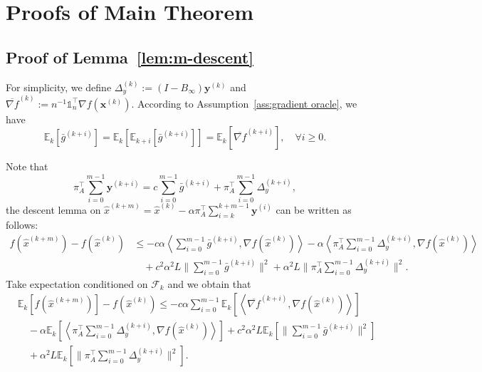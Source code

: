 \documentclass[10pt]{article}
\newcommand{\one}{\mathds{1}_n}
\newcommand{\vx}{{\mathbf{x}}}
\newcommand{\vy}{{\mathbf{y}}}
\newcommand{\cF}{{\mathcal{F}}}
\newcommand{\EE}{\mathbb{E}}
\newcommand{\norm}[1]{\| #1 \|}
\newcommand{\ip}[1]{\left\langle#1\right\rangle}
\begin{document}
\section{Proofs of Main Theorem}\label{app:sec:proofs}

\subsection{Proof of Lemma~\ref{lem:m-descent}}\label{app:subsec:lem 4.3}
For simplicity, we define $\Delta_y^{(k)}:=(I-B_\infty)\vy^{(k)}$ and $\overline{\nabla f}^{(k)}:=n^{-1}\one^\top \nabla f (\vx^{(k)})$. According to Assumption~\ref{ass:gradient oracle}, we have
\[\EE_k[\bar{g}^{(k+i)}]=\EE_k[\EE_{k+i}[\bar{g}^{(k+i)}]]=\EE_k[\overline{\nabla f}^{(k+i)}],\quad \forall i\ge 0.\]

Note that 
\[\pi_A^\top\sum_{i=0}^{m-1} \vy^{(k+i)} = c\sum_{i=0}^{m-1}\bar{g}^{(k+i)}+\pi_A^\top \sum_{i=0}^{m-1}\Delta_y^{(k+i)},\]
the descent lemma on $\hat{x}^{(k+m)}=\hat{x}^{(k)}-\alpha \pi_A^\top\sum_{i=k}^{k+m-1}\vy^{(i)}$ can be written as follows:
\begin{align*}
    f(\hat{x}^{(k+m)})- f(\hat{x}^{(k)})&\le -c\alpha \ip{\sum_{i=0}^{m-1}\bar{g}^{(k+i)},\nabla f(\hat{x}^{(k)})}-\alpha \ip{\pi_A^\top \sum_{i=0}^{m-1}\Delta_y^{(k+i)},\nabla f(\hat{x}^{(k)})}\\
    &\quad+c^2\alpha^2L \norm{\sum_{i=0}^{m-1}\bar{g}^{(k+i)}}^2+\alpha^2L\norm{\pi_A^\top\sum_{i=0}^{m-1}\Delta_y^{(k+i)}}^2.
\end{align*}
Take expectation conditioned on $\cF_k$ and we obtain that
\begin{align}\label{eq:des-1}
    &\EE_k[f(\hat{x}^{(k+m)})]-f(\hat{x}^{(k)})\le -c\alpha \sum_{i=0}^{m-1}\EE_k\left[\ip{\overline{\nabla f}^{(k+i)},\nabla f(\hat{x}^{(k)})}\right]\\
    &\quad-\alpha \EE_k\left[\ip{\pi_A^\top \sum_{i=0}^{m-1}\Delta_y^{(k+i)},\nabla f(\hat{x}^{(k)})}\right]+c^2\alpha^2L \EE_k[\norm{\sum_{i=0}^{m-1}\bar{g}^{(k+i)}}^2]\nonumber\\
    &\quad+\alpha^2L\EE_k[\norm{\pi_A^\top\sum_{i=0}^{m-1}\Delta_y^{(k+i)}}^2].\nonumber
\end{align}
\end{document}
